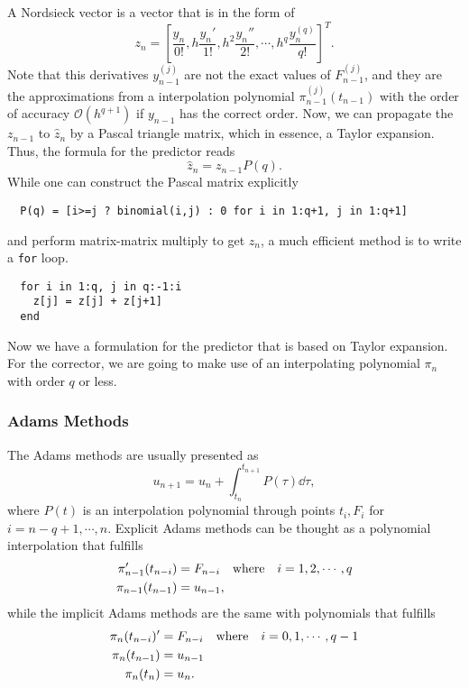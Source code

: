 \documentclass[11pt,a4paper]{article}
\begin{document}
A Nordsieck vector is a vector that is in the form of
\begin{equation}
        z_n = \left[\frac{y_n}{0!}, h\frac{y_n'}{1!}, h^2\frac{y_n''}{2!},
        \cdots, h^q\frac{y_n^{(q)}}{q!}\right]^T.
\end{equation}
Note that this derivatives $y_{n-1}^{(j)}$ are not the exact values of
$F^{(j)}_{n-1}$, and they are the approximations from a interpolation
polynomial $\pi_{n-1}^{(j)}(t_{n-1})$ with the order of accuracy
$\mathcal{O}(h^{q+1})$ if $y_{n-1}$ has the correct order. Now, we can
propagate the $z_{n-1}$ to $\hat{z}_{n}$ by a Pascal triangle matrix, which in
essence, a Taylor expansion. Thus, the formula for the predictor reads
\begin{equation}
  \hat{z}_n = z_{n-1}P(q).
\end{equation}
While one can construct the Pascal matrix explicitly
\begin{lstlisting}
  P(q) = [i>=j ? binomial(i,j) : 0 for i in 1:q+1, j in 1:q+1]
\end{lstlisting}
and perform matrix-matrix multiply to get $z_n$, a much efficient method is to
write a \texttt{for} loop.
\begin{lstlisting}
  for i in 1:q, j in q:-1:i
    z[j] = z[j] + z[j+1]
  end
\end{lstlisting}

Now we have a formulation for the predictor that is based on Taylor expansion.
For the corrector, we are going to make use of an interpolating polynomial
$\pi_{n}$ with order $q$ or less.


\subsubsection{Adams Methods} \label{subsec:adams}
The Adams methods are usually presented as
\begin{equation} \label{eq:Adams_int}
  u_{n+1} = u_n + \int_{t_n}^{t_{n+1}} P(\tau) \dd{\tau},
\end{equation}
where $P(t)$ is an interpolation polynomial through points $t_i, F_i$ for
$i=n-q+1,\cdots,n$.
Explicit Adams methods can be thought as a polynomial interpolation that
fulfills
\begin{align}
  \pi_{n-1}'(t_{n-i})&=F_{n-i}\qq{where} i=1,2,\cdots,q \\
  \pi_{n-1}(t_{n-1})&=u_{n-1},
\end{align}
while the implicit Adams methods are the same with polynomials that fulfills
\begin{align}
  \pi_{n}(t_{n-i})'&=F_{n-i}\qq{where} i=0,1,\cdots,q-1 \\
  \pi_{n}(t_{n-1})&=u_{n-1} \\
  \pi_{n}(t_{n})&=u_{n}.
\end{align}
\end{document}
